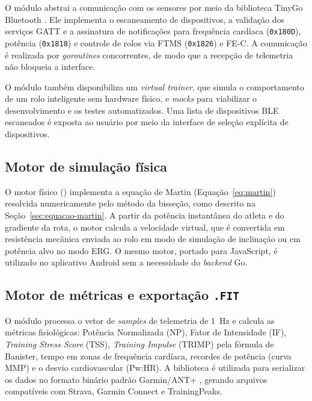 O módulo  abstrai a comunicação com os sensores por
meio da biblioteca TinyGo Bluetooth \cite{tinygo2024}. Ele implementa o
escaneamento de dispositivos, a validação dos serviços GATT e a assinatura de
notificações para frequência cardíaca (\texttt{0x180D}), potência
(\texttt{0x1818}) e controle de rolos via FTMS (\texttt{0x1826}) e FE-C. A
comunicação é realizada por \textit{goroutines} concorrentes, de modo que a
recepção de telemetria não bloqueia a interface.

O módulo também disponibiliza um \textit{virtual trainer}, que simula o
comportamento de um rolo inteligente sem hardware físico, e \textit{mocks} para
viabilizar o desenvolvimento e os testes automatizados. Uma lista de dispositivos
BLE escaneados é exposta ao usuário por meio da interface de seleção explícita de
dispositivos.

\subsection{Motor de simulação física}
\label{sec:implementacao-sim}

O motor físico () implementa a equação de Martin
(Equação~\ref{eq:martin}) resolvida numericamente pelo método da bisseção, como
descrito na Seção~\ref{sec:equacao-martin}. A partir da potência instantânea
do atleta e do gradiente da rota, o motor calcula a velocidade virtual, que é
convertida em resistência mecânica enviada ao rolo em modo de simulação de
inclinação ou em potência alvo no modo ERG. O mesmo motor, portado para
JavaScript, é utilizado no aplicativo Android sem a necessidade do
\textit{backend} Go.

\subsection{Motor de métricas e exportação \texttt{.FIT}}
\label{sec:implementacao-fit}

O módulo  processa o vetor de \textit{samples} de
telemetria de \SI{1}{\hertz} e calcula as métricas fisiológicas: Potência
Normalizada (NP), Fator de Intensidade (IF), \textit{Training Stress Score}
(TSS), \textit{Training Impulse} (TRIMP) pela fórmula de Banister, tempo em
zonas de frequência cardíaca, recordes de potência (curva MMP) e o desvio
cardiovascular (Pw:HR). A biblioteca  \cite{fitgo2024} é
utilizada para serializar os dados no formato binário padrão Garmin/ANT+
\cite{garmin2024}, gerando arquivos compatíveis com Strava, Garmin Connect e
TrainingPeaks.

